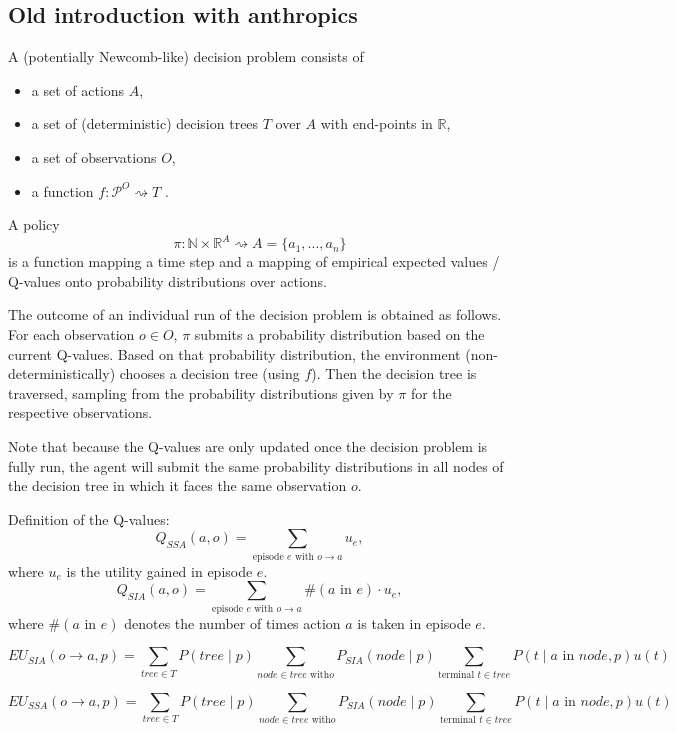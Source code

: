 \documentclass{article}
\begin{document}
\subsection*{Old introduction with anthropics}

A (potentially Newcomb-like) decision problem consists of
\begin{itemize}
\item a set of actions $A$,
\item a set of (deterministic) decision trees $T$ over $A$ with end-points in $\mathbb{R}$,
\item a set of observations $O$,
\item a function $f:\mathcal{P}^O \rightsquigarrow T$ .
\end{itemize}
A policy
\begin{equation}
\pi:\mathbb{N}\times \mathbb{R}^A \rightsquigarrow A=\{a_1,...,a_n\}
\end{equation}
is a function mapping a time step and a mapping of empirical expected values / Q-values onto probability distributions over actions.

The outcome of an individual run of the decision problem is obtained as follows. For each observation $o\in O$, $\pi$ submits a probability distribution based on the current Q-values. Based on that probability distribution, the environment (non-deterministically) chooses a decision tree (using $f$). Then the decision tree is traversed, sampling from the probability distributions given by $\pi$ for the respective observations.

Note that because the Q-values are only updated once the decision problem is fully run, the agent will submit the same probability distributions in all nodes of the decision tree in which it faces the same observation $o$.

Definition of the Q-values:
\begin{equation}
Q_{SSA}(a,o) = \sum_{\text{episode }e\text{ with }o\rightarrow a} u_e,
\end{equation} where $u_e$ is the utility gained in episode $e$.
\begin{equation}Q_{SIA} (a,o) = \sum_{\text{episode }e\text{ with }o\rightarrow a} \#(a\text{ in }e) \cdot u_e,\end{equation}
where $\#(a\text{ in }e)$ denotes the number of times action $a$ is taken in episode $e$.

\begin{equation}
EU_{SIA}(o\rightarrow a,p)=\sum_{tree\in T} P(tree\mid p) \sum_{node\in tree\text{ with} o} P_{SIA}(node \mid p) \sum_{\text{terminal }t\in tree} P(t \mid a\text{ in }node, p) u(t)
\end{equation}

\begin{equation}
EU_{SSA}(o\rightarrow a,p)=\sum_{tree\in T} P(tree\mid p) \sum_{node\in tree\text{ with} o} P_{SIA}(node \mid p) \sum_{\text{terminal }t\in tree} P(t \mid a\text{ in }node, p) u(t)
\end{equation}
\end{document}
